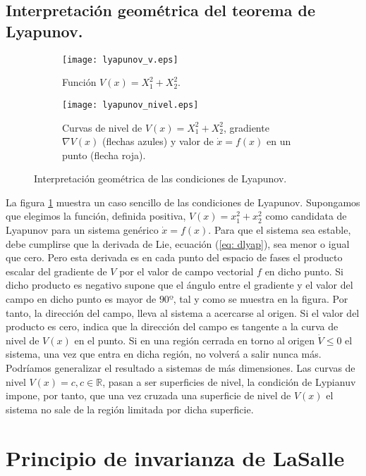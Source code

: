 \subsection{Interpretación geométrica del teorema de Lyapunov.}
\begin{figure}
\centering
\begin{subfigure}[b]{0.49\textwidth}
\centering
\texttt{[image: lyapunov\_v.eps]}
\caption{Función $V(x) = X_1^2+X_2^2$.}
\end{subfigure}
\begin{subfigure}[b]{0.49\textwidth}
\centering
\texttt{[image: lyapunov\_nivel.eps]}
\caption{Curvas de nivel de $V(x) = X_1^2+X_2^2$, gradiente $\nabla V(x)$ (flechas azules) y valor de $\dot x = f(x)$ en un punto (flecha roja).}
\end{subfigure}
\caption{Interpretación geométrica de las condiciones de Lyapunov.}
\label{fig: lyap}
\end{figure}
 La figura \ref{fig: lyap} muestra un caso sencillo de las condiciones de Lyapunov. Supongamos que elegimos la función, definida positiva,  $V(x) = x_1^2 + x_2^2$ como candidata de Lyapunov para un sistema genérico $\dot x = f(x)$.  Para que el sistema sea estable, debe cumplirse que la derivada de Lie, ecuación  (\ref{eq: dlyap}), sea menor o igual que cero.  Pero esta derivada es en cada punto del espacio de fases el producto escalar del gradiente de $V$ por el valor de campo vectorial $f$ en dicho punto. Si dicho producto es negativo supone que el ángulo entre el gradiente y el valor del campo en dicho punto es mayor de $90º$, tal y como se muestra en la figura. Por tanto, la dirección del campo, lleva al sistema a acercarse al origen. Si el valor del producto es cero, indica que la dirección del campo es tangente a la curva de nivel de  $V(x)$ en el punto. Si en una región cerrada en torno al origen $\dot V \leq 0$ el sistema, una vez que entra en dicha región, no volverá a salir nunca más.
 Podríamos generalizar el resultado a sistemas de más dimensiones. Las curvas de nivel  $V(x)=c, c \in \mathbb{R} $, pasan a ser superficies de nivel, la condición de Lypianuv impone, por tanto, que una vez cruzada una superficie de nivel de $V(x)$ el sistema no sale de la región limitada por dicha superficie.
 
\section{Principio de invarianza de LaSalle}

